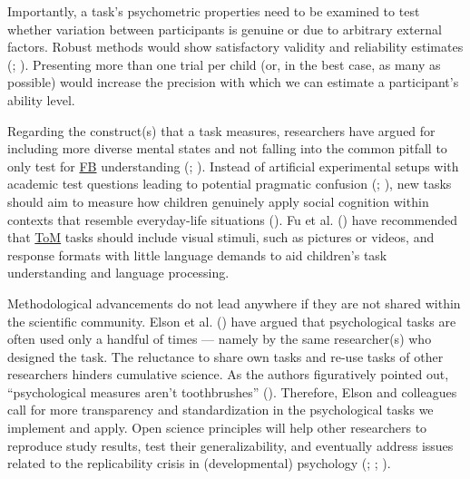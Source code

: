 \documentclass[
]{scrbook}
\begin{document}
Importantly, a task's psychometric properties need to be examined to test whether variation between participants is genuine or due to arbitrary external factors. Robust methods would show satisfactory validity and reliability estimates (; ). Presenting more than one trial per child (or, in the best case, as many as possible) would increase the precision with which we can estimate a participant's ability level.

Regarding the construct(s) that a task measures, researchers have argued for including more diverse mental states and not falling into the common pitfall to only test for \hyperref[acronyms_FB]{FB} understanding (; ). Instead of artificial experimental setups with academic test questions leading to potential pragmatic confusion (; ), new tasks should aim to measure how children genuinely apply social cognition within contexts that resemble everyday-life situations (). Fu et al. () have recommended that \hyperref[acronyms_ToM]{ToM} tasks should include visual stimuli, such as pictures or videos, and response formats with little language demands to aid children's task understanding and language processing.

Methodological advancements do not lead anywhere if they are not shared within the scientific community. Elson et al. () have argued that psychological tasks are often used only a handful of times --- namely by the same researcher(s) who designed the task. The reluctance to share own tasks and re-use tasks of other researchers hinders cumulative science. As the authors figuratively pointed out, ``psychological measures aren't toothbrushes'' (). Therefore, Elson and colleagues call for more transparency and standardization in the psychological tasks we implement and apply. Open science principles will help other researchers to reproduce study results, test their generalizability, and eventually address issues related to the replicability crisis in (developmental) psychology (; ; ).
\end{document}
